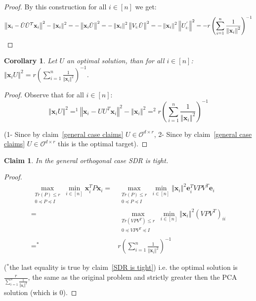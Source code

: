 \documentclass{article}
\newtheorem{corollary}{Corollary}
\newtheorem{claim}{Claim}
\newcommand{\claimref}[1]{claim~\ref{#1}}
\newcommand{\x}{{\mathbf x}}
\newcommand{\e}{{\mathbf e}}
\newcommand{\cO}{\mathcal{O}}
\newcommand{\orth}[2]{\cO^{#1\times #2}}
\begin{document}
\begin{proof}
By this construction for all $i\in[n]$ we get: 
$$
\left\Vert\x_{i}-{\Tilde{U}}{\Tilde{U}}^T\x_{i}\right\Vert^{2} - \left\Vert\x_{i}\right\Vert^{2}=-\left\Vert \x_i\Tilde{U}\right\Vert^{2}=-\left\Vert\x_{i}\right\Vert^{2}\left\Vert V_{i:}\Tilde{U}\right\Vert^{2}=-\left\Vert\x_{i}\right\Vert^{2}\left\Vert {U^{'}_{i:}}\right\Vert^{2}=-r\left({\sum_{i=1}^n\frac{1}{\left\Vert\x_{i}\right\Vert^{2}}}\right)^{-1}
$$
\end{proof}

\begin{corollary}\label{all equal general case}
Let $U$ an optimal solution, than for all $i\in[n]$: $\left\Vert{\x_iU}\right\Vert^2=r\left({\sum_{i=1}^n\frac{1}{\left\Vert\x_{i}\right\Vert^{2}}}\right)^{-1}$.
\end{corollary}

\begin{proof}
Observe that for all $i\in[n]$: $$\left\Vert{\x_iU}\right\Vert^2=^1\left\Vert\x_{i}-{{U}}{{U}}^T\x_{i}\right\Vert^{2} - \left\Vert\x_{i}\right\Vert^{2}=^2r\left({\sum_{i=1}^n\frac{1}{\left\Vert \x_{i}\right\Vert^{2}}}\right)^{-1}$$

(1- Since by \claimref{general case claims} $U\in\orth{d}{r}$, 2- Since by \claimref{general case claims} $U\in\orth{d}{r}$ this is the optimal target).
\end{proof}

\begin{claim}
In the general orthogonal case SDR is tight.
\end{claim}
\begin{proof}

\begin{align*}
    \max_{\begin{array}{c}
    Tr\left(P\right)\le r\\
    0\preceq P\preceq I
    \end{array}}\min_{i\in[n]}\x_{i}^TP\x_{i}
    =&\max_{\begin{array}{c}
    Tr\left(P\right)\le r\\
    0\preceq P\preceq I
    \end{array}}\min_{i\in[n]}\left\Vert \x_{i}\right\Vert^{2}\e_{i}^TVPV^T\e_{i}\\
    =& \max_{\begin{array}{c}
    Tr\left(VPV^T\right)\le r\\
    0\preceq VPV^T\preceq I
    \end{array}}\min_{i\in[n]}\left\Vert \x_{i}\right\Vert^{2}(VPV^T)_{ii}\\
    =^*&r\left({\sum_{i=1}^n \frac{1}{\left\Vert \x_{i}\right\Vert^{2}}}\right)^{-1}
\end{align*}
    
($^*$the last equality is true by \claimref{SDR is tight}) i.e. the optimal solution is $\frac{r}{\sum_{i=1}^n\frac{1}{\left\Vert \x_{i}\right\Vert^{2}}}$, the same as the original problem and strictly greater then the PCA solution (which is 0).
\end{proof}
\end{document}
